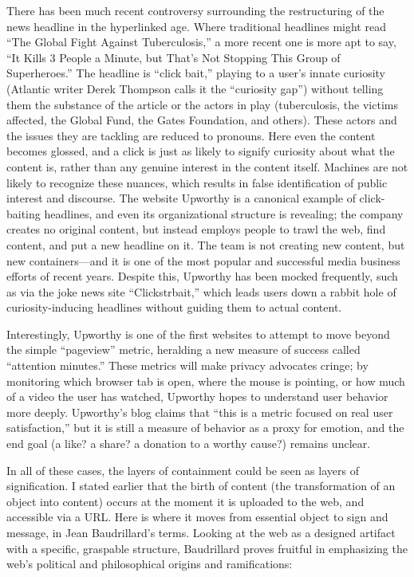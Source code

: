 There has been much recent controversy surrounding the restructuring of the news headline in the hyperlinked age. Where traditional headlines might read “The Global Fight Against Tuberculosis,” a more recent one is more apt to say, “It Kills 3 People a Minute, but That’s Not Stopping This Group of Superheroes.”  The headline is “click bait,” playing to a user’s innate curiosity (Atlantic writer Derek Thompson calls it the “curiosity gap”)  without telling them the substance of the article or the actors in play (tuberculosis, the victims affected, the Global Fund, the Gates Foundation, and others). These actors and the issues they are tackling are reduced to pronouns. Here even the content becomes glossed, and a click is just as likely to signify curiosity about what the content is, rather than any genuine interest in the content itself. Machines are not likely to recognize these nuances, which results in false identification of public interest and discourse. The website Upworthy is a canonical example of click-baiting headlines, and even its organizational structure is revealing; the company creates no original content, but instead employs people to trawl the web, find content, and put a new headline on it. The team is not creating new content, but new containers—and it is one of the most popular and successful media business efforts of recent years. Despite this, Upworthy has been mocked frequently, such as via the joke news site “Clickstrbait,” which leads users down a rabbit hole of curiosity-inducing headlines without guiding them to actual content.

Interestingly, Upworthy is one of the first websites to attempt to move beyond the simple “pageview” metric, heralding a new measure of success called “attention minutes.” These metrics will make privacy advocates cringe; by monitoring which browser tab is open, where the mouse is pointing, or how much of a video the user has watched, Upworthy hopes to understand user behavior more deeply. Upworthy’s blog claims that “this is a metric focused on real user satisfaction,” but it is still a measure of behavior as a proxy for emotion, and the end goal (a like? a share? a donation to a worthy cause?) remains unclear. 

In all of these cases, the layers of containment could be seen as layers of signification. I stated earlier that the birth of content (the transformation of an object into content) occurs at the moment it is uploaded to the web, and accessible via a URL. Here is where it moves from essential object to sign and message, in Jean Baudrillard’s terms. Looking at the web as a designed artifact with a specific, graspable structure, Baudrillard proves fruitful in emphasizing the web’s political and philosophical origins and ramifications:

